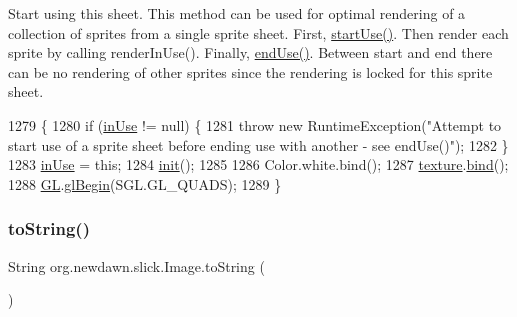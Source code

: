 Start using this sheet. This method can be used for optimal rendering of a collection of sprites from a single sprite sheet. First, \mbox{\hyperlink{classorg_1_1newdawn_1_1slick_1_1_image_a6c7c3f31d0a0a4c73026c8dac8dec7d2}{start\+Use()}}. Then render each sprite by calling render\+In\+Use(). Finally, \mbox{\hyperlink{classorg_1_1newdawn_1_1slick_1_1_image_a2506df1ee54d606232317b20c29b6db5}{end\+Use()}}. Between start and end there can be no rendering of other sprites since the rendering is locked for this sprite sheet. 
\begin{DoxyCode}
1279                            \{
1280         \textcolor{keywordflow}{if} (\mbox{\hyperlink{classorg_1_1newdawn_1_1slick_1_1_image_a2a474928fc97b6caec518f7eb6e553e6}{inUse}} != null) \{
1281             \textcolor{keywordflow}{throw} \textcolor{keyword}{new} RuntimeException(\textcolor{stringliteral}{"Attempt to start use of a sprite sheet before ending use with
       another - see endUse()"});
1282         \}
1283         \mbox{\hyperlink{classorg_1_1newdawn_1_1slick_1_1_image_a2a474928fc97b6caec518f7eb6e553e6}{inUse}} = \textcolor{keyword}{this};
1284         \mbox{\hyperlink{classorg_1_1newdawn_1_1slick_1_1_image_a94d180c9218ba1444a0496a1898ec345}{init}}();
1285 
1286         Color.white.bind();
1287         \mbox{\hyperlink{classorg_1_1newdawn_1_1slick_1_1_image_a9fd9ddb21247305c83ac4e37d9d51f79}{texture}}.\mbox{\hyperlink{interfaceorg_1_1newdawn_1_1slick_1_1opengl_1_1_texture_a97c02b82a8170c4c0bccb570dc872873}{bind}}();
1288         \mbox{\hyperlink{classorg_1_1newdawn_1_1slick_1_1_image_aafbab31355bec79e747f477e970dcda4}{GL}}.\mbox{\hyperlink{interfaceorg_1_1newdawn_1_1slick_1_1opengl_1_1renderer_1_1_s_g_l_a34ef78aa5f8f5774c06117a01932fb02}{glBegin}}(SGL.GL\_QUADS);
1289     \}
\end{DoxyCode}
\mbox{\label{classorg_1_1newdawn_1_1slick_1_1_image_ab61e19db4aef03043c0f0747e004e390}} 
\subsubsection{\texorpdfstring{to\+String()}{toString()}}
{\footnotesize\ttfamily String org.\+newdawn.\+slick.\+Image.\+to\+String (\begin{DoxyParamCaption}{ }\end{DoxyParamCaption})\hspace{0.3cm}{\ttfamily [inline]}}

